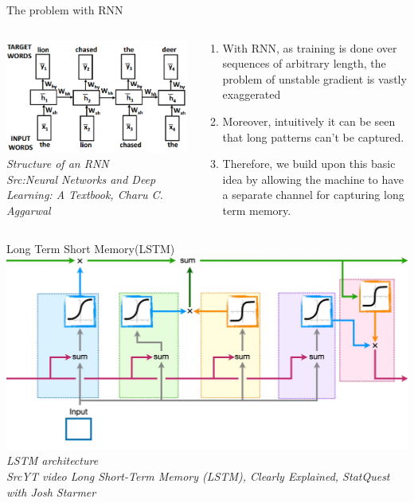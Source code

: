 \begin{frame}{The problem with RNN}
	\begin{columns}[T]
        \begin{column}{0.4\textwidth}
        	\includegraphics[width=\textwidth]{images/RNN struct.png}
			\tiny{\textit{Structure of an RNN\\Src:Neural Networks and Deep Learning: A Textbook, Charu C. Aggarwal  }}
        \end{column}
		\begin{column}{0.6\textwidth}
			\begin{enumerate}[$\bullet$]
				\item With RNN, as training is done over sequences of arbitrary length, the problem of unstable gradient is vastly exaggerated\pause
				\item Moreover, intuitively it can be seen that long patterns can't be captured.\pause
				\item Therefore, we build upon this basic idea by allowing the machine to have a separate channel for capturing long term memory. 
			\end{enumerate}
		\end{column} 
    \end{columns}
\end{frame}

\begin{frame}{Long Term Short Memory(LSTM)}
	\includegraphics[width=\textwidth]{images/LSTM.png}
	\tiny{\textit{LSTM architecture\\SrcYT video Long Short-Term Memory (LSTM), Clearly Explained, StatQuest with Josh Starmer}}
\end{frame}


